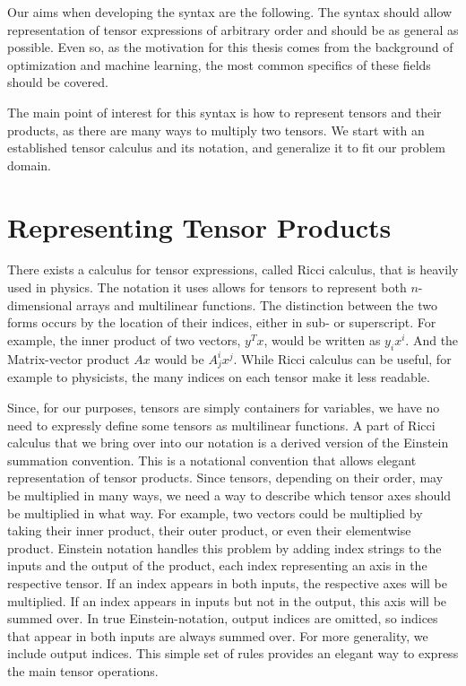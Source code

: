\documentclass[12pt, a4paper]{report}
\begin{document}
Our aims when developing the syntax are the following.
The syntax should allow representation of tensor expressions of arbitrary order and should be as general as possible.
Even so, as the motivation for this thesis comes from the background of optimization and machine learning, the most common specifics of these fields should be covered.

The main point of interest for this syntax is how to represent tensors and their products, as there are many ways to multiply two tensors.
We start with an established tensor calculus and its notation, and generalize it to fit our problem domain.

\section{Representing Tensor Products}
There exists a calculus for tensor expressions, called Ricci calculus, that is heavily used in physics. %
The notation it uses allows for tensors to represent both $n$-dimensional arrays and multilinear functions.
The distinction between the two forms occurs by the location of their indices, either in sub- or superscript.
For example, the inner product of two vectors, $y^Tx$, would be written as $y_ix^i$. And the Matrix-vector product $Ax$ would be $A^i_jx^j$.
While Ricci calculus can be useful, for example to physicists, the many indices on each tensor make it less readable.

Since, for our purposes, tensors are simply containers for variables, we have no need to expressly define some tensors as multilinear functions.
A part of Ricci calculus that we bring over into our notation is a derived version of the Einstein summation convention. %
This is a notational convention that allows elegant representation of tensor products.
Since tensors, depending on their order, may be multiplied in many ways, we need a way to describe which tensor axes should be multiplied in what way.
For example, two vectors could be multiplied by taking their inner product, their outer product, or even their elementwise product.
Einstein notation handles this problem by adding index strings to the inputs and the output of the product, each index representing an axis in the respective tensor.
If an index appears in both inputs, the respective axes will be multiplied.
If an index appears in inputs but not in the output, this axis will be summed over.
In true Einstein-notation, output indices are omitted, so indices that appear in both inputs are always summed over. 
For more generality, we include output indices.
This simple set of rules provides an elegant way to express the main tensor operations.
\end{document}
